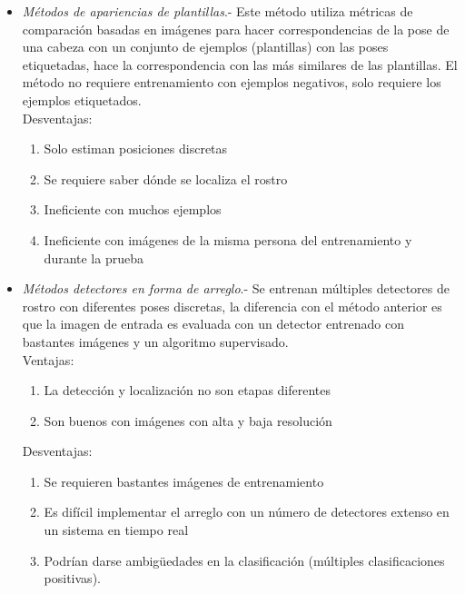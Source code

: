     \begin{itemize}
    	\item \textit{Métodos de apariencias de plantillas}.- Este método utiliza métricas de comparación basadas en imágenes para hacer correspondencias de la pose de una cabeza con un conjunto de ejemplos (plantillas) con las poses etiquetadas, hace la correspondencia con las más similares de las plantillas. El método no requiere entrenamiento con ejemplos negativos, solo requiere los ejemplos etiquetados.\\
    	Desventajas:
    	\begin{enumerate}[label=(\alph*)]
    		\item Solo estiman posiciones discretas
    		\item Se requiere saber dónde se localiza el rostro
    		\item Ineficiente con muchos ejemplos
    		\item Ineficiente con imágenes de la misma persona del entrenamiento y durante la prueba
    	\end{enumerate}
\item \textit{Métodos detectores en forma de arreglo}.- Se entrenan múltiples detectores de rostro con diferentes poses discretas, la diferencia con el método anterior es que la imagen de entrada es evaluada con un detector entrenado con bastantes imágenes y un algoritmo supervisado.
\\Ventajas:
\begin{enumerate}[label=(\alph*)]
	\item La detección y localización no son etapas diferentes
	\item Son buenos con imágenes con alta y baja resolución
\end{enumerate}
Desventajas:
\begin{enumerate}[label=(\alph*)]
	\item Se requieren bastantes imágenes de entrenamiento
	\item Es difícil implementar el arreglo con un número de detectores  extenso en un sistema en tiempo real
	\item Podrían darse ambigüedades en la clasificación (múltiples clasificaciones positivas).
\end{enumerate}


\end{itemize}
